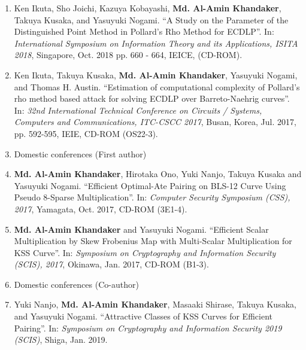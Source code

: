 \documentclass{article}[paper=a4,10pt]
\begin{document}
\begin{enumerate}
	\item Ken Ikuta, Sho Joichi, Kazuya Kobayashi, \textbf{Md. Al-Amin Khandaker}, Takuya Kusaka, and Yasuyuki Nogami. ``A Study on the Parameter of the Distinguished Point Method in Pollard's Rho Method for ECDLP''. In: \textit{International Symposium on Information Theory and its Applications, ISITA 2018},  Singapore, Oct. 2018 pp. 660 - 664,  IEICE, (CD-ROM).
	
	\item Ken Ikuta, Takuya Kusaka, \textbf{Md. Al-Amin Khandaker}, Yasuyuki Nogami, and Thomas H. Austin. ``Estimation of computational complexity of Pollard's rho method based attack for solving ECDLP over Barreto-Naehrig curves''. In: \textit{32nd International Technical Conference on Circuits / Systems, Computers and Communications, ITC-CSCC 2017},  Busan, Korea, Jul. 2017, pp. 592-595, IEIE, CD-ROM (OS22-3).
	\vspace{10mm}
	\large
	\item [] \Large Domestic conferences (First author)
	\normalsize
	
	\item \textbf{Md. Al-Amin Khandaker}, Hirotaka Ono, Yuki Nanjo, Takuya Kusaka and Yasuyuki Nogami. ``Efficient Optimal-Ate Pairing on BLS-12 Curve Using Pseudo 8-Sparse Multiplication''. In: \textit{Computer Security Symposium  (CSS),  2017}, Yamagata, Oct. 2017, CD-ROM (3E1-4). 
	
	\item \textbf{Md. Al-Amin Khandaker} and Yasuyuki Nogami. ``Efficient Scalar Multiplication by Skew Frobenius Map with Multi-Scalar Multiplication for KSS Curve''. In: \textit{Symposium on Cryptography and Information Security (SCIS),  2017}, Okinawa, Jan. 2017, CD-ROM (B1-3). 
	
	\vspace{10mm}
	\large
	\item[] \Large Domestic conferences (Co-author)
	\normalsize
			\item Yuki Nanjo, \textbf{Md. Al-Amin Khandaker}, Masaaki Shirase, Takuya Kusaka, and Yasuyuki Nogami.
		``Attractive Classes of KSS Curves for Efficient Pairing''.
		In: {\it Symposium on Cryptography and Information Security 2019 (SCIS)}, Shiga, Jan. 2019.
	

\end{enumerate}
\end{document}
